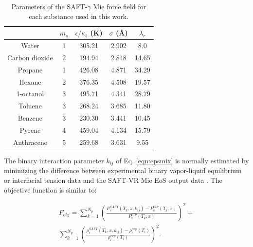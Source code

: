 \begin{table}
	\centering
	\caption{Parameters of the SAFT-$\gamma$ Mie force field for each substance used in this work.}
	\label{tbl:parameters}
	\begin{tabular}{ccccc}
		\hline
		\hline
		& $m_s$ & $\epsilon/\kappa_{b}$ (K) & $\sigma$ (\AA) & $\lambda_r$ \\ \hline\hline
		Water          & 1     & 305.21               & 2.902              & 8.0         \\
		Carbon dioxide & 2     & 194.94               & 2.848              & 14.65       \\
		Propane        & 1     & 426.08               & 4.871              & 34.29       \\
		Hexane         & 2     & 376.35               & 4.508              & 19.57       \\
		1-octanol        & 3     & 495.71               & 4.341              & 28.79       \\
		Toluene        & 3     & 268.24               & 3.685              & 11.80       \\
		Benzene        & 3     & 230.30               & 3.441              & 10.45       \\
		Pyrene         & 4     & 459.04               & 4.134              & 15.79       \\
		Anthracene     & 5     & 259.68               & 3.631              & 9.55        \\ 
		\hline
		\hline
	\end{tabular}
	
\end{table}
\FloatBarrier
The binary interaction parameter $k_{ij}$ of Eq. \eqref{eqn:epsmix} is normally estimated by minimizing the difference between experimental binary vapor-liquid equilibrium or interfacial tension data and the SAFT-VR Mie EoS output data \cite{muller2017,lobanova2016}. The objective function is similar to: 

\begin{equation}
\begin{aligned}
F_{obj}= \sum_{k=1}^{N_{p}} \left(\frac{P_{v}^{SAFT}(T_{k},x,k_{ij})-P_{v}^{exp}(T_{k},x)}{P_{v}^{exp}(T_{k},x)} \right)^2 +\\
\sum_{k=1}^{N_{p}} \left(\frac{\rho_{l}^{SAFT}(T_{k},x,k_{ij})-\rho_{l}^{exp}(T_{i})}{\rho_{l}^{exp}(T_{i})} \right)^2 .
\end{aligned}
\label{eqn:fobjmix}
\end{equation}

